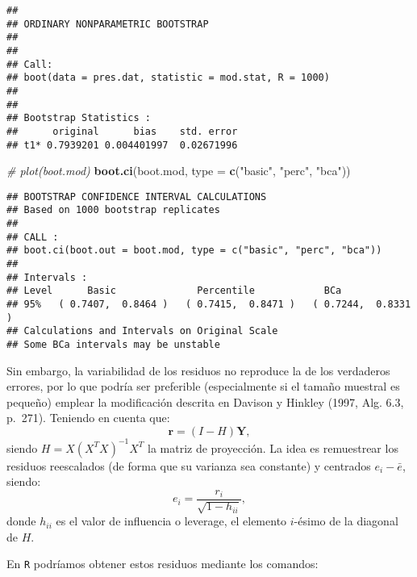 \documentclass[
]{book}
\newenvironment{Shaded}{\begin{snugshade}}{\end{snugshade}}
\newcommand{\CommentTok}[1]{\textcolor[rgb]{0.56,0.35,0.01}{\textit{#1}}}
\newcommand{\DataTypeTok}[1]{\textcolor[rgb]{0.13,0.29,0.53}{#1}}
\newcommand{\DecValTok}[1]{\textcolor[rgb]{0.00,0.00,0.81}{#1}}
\newcommand{\KeywordTok}[1]{\textcolor[rgb]{0.13,0.29,0.53}{\textbf{#1}}}
\newcommand{\NormalTok}[1]{#1}
\newcommand{\OperatorTok}[1]{\textcolor[rgb]{0.81,0.36,0.00}{\textbf{#1}}}
\newcommand{\StringTok}[1]{\textcolor[rgb]{0.31,0.60,0.02}{#1}}
\theoremstyle{break}
\theoremstyle{definition}
\theoremstyle{definition}
\theoremstyle{definition}
\theoremstyle{remark}
\begin{document}
\begin{verbatim}
## 
## ORDINARY NONPARAMETRIC BOOTSTRAP
## 
## 
## Call:
## boot(data = pres.dat, statistic = mod.stat, R = 1000)
## 
## 
## Bootstrap Statistics :
##      original      bias    std. error
## t1* 0.7939201 0.004401997  0.02671996
\end{verbatim}

\begin{Shaded}
\begin{Highlighting}[]
\CommentTok{# plot(boot.mod)}
\KeywordTok{boot.ci}\NormalTok{(boot.mod, }\DataTypeTok{type =} \KeywordTok{c}\NormalTok{(}\StringTok{"basic"}\NormalTok{, }\StringTok{"perc"}\NormalTok{, }\StringTok{"bca"}\NormalTok{))}
\end{Highlighting}
\end{Shaded}

\begin{verbatim}
## BOOTSTRAP CONFIDENCE INTERVAL CALCULATIONS
## Based on 1000 bootstrap replicates
## 
## CALL : 
## boot.ci(boot.out = boot.mod, type = c("basic", "perc", "bca"))
## 
## Intervals : 
## Level      Basic              Percentile            BCa          
## 95%   ( 0.7407,  0.8464 )   ( 0.7415,  0.8471 )   ( 0.7244,  0.8331 )  
## Calculations and Intervals on Original Scale
## Some BCa intervals may be unstable
\end{verbatim}

Sin embargo, la variabilidad de los residuos no reproduce la de los verdaderos errores, por lo que podría ser preferible (especialmente si el tamaño muestral es pequeño) emplear la modificación descrita en Davison y Hinkley (1997, Alg. 6.3, p.~271).
Teniendo en cuenta que:
\[\mathbf{r} = \left( I - H \right)\mathbf{Y},\]
siendo \(H = X\left( X^{T}X\right)^{-1}X^{T}\) la matriz de proyección.
La idea es remuestrear los residuos reescalados (de forma que su varianza sea constante) y centrados \(e_i - \bar{e}\), siendo:
\[e_i = \frac{r_i}{\sqrt{1 - h_{ii}}},\]
donde \(h_{ii}\) es el valor de influencia o leverage, el elemento \(i\)-ésimo de la diagonal de \(H\).

En \texttt{R} podríamos obtener estos residuos mediante los comandos:

\begin{Shaded}
\end{Shaded}
\end{document}
